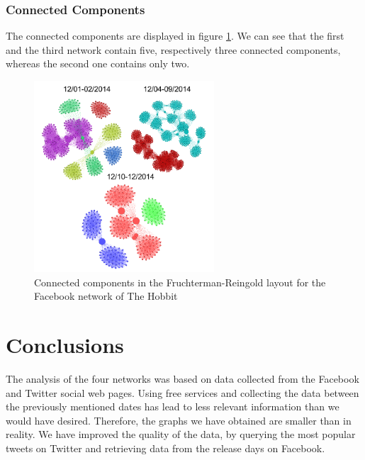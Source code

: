 \documentclass{llncs}
\begin{document}
\subsubsection{Connected Components}
The connected components are displayed in figure \ref{fig:hobbit-facebook-cc}.
We can see that the first and the third network contain five, respectively three
connected components, whereas the second one contains only two.
%
\begin{figure}
\centering
\includegraphics[width=0.6\textwidth]{hobbit-facebook-cc.png}
\caption{Connected components in the Fruchterman-Reingold layout for the
    Facebook network of The Hobbit
\label{fig:hobbit-facebook-cc}}
\end{figure}
%
\section{Conclusions}
The analysis of the four networks was based on data collected from the Facebook
and Twitter social web pages. Using free services and collecting the data
between the previously mentioned dates has lead to less relevant information
than we would have desired. Therefore, the graphs we have obtained are smaller
than in reality. We have improved the quality of the data, by querying the most
popular tweets on Twitter and retrieving data from the release days on Facebook.
\end{document}
